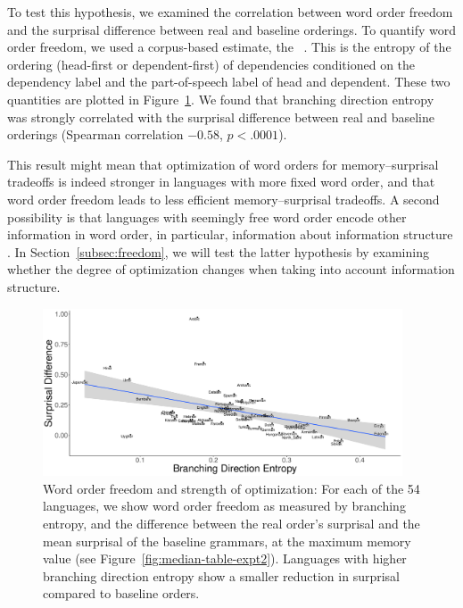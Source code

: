 To test this hypothesis, we examined the correlation between word order freedom and the surprisal difference between real and baseline orderings.
To quantify word order freedom, we used a corpus-based estimate, the ~\citep{futrell-quantifying-2015}.
This is the entropy of the ordering (head-first or dependent-first) of dependencies conditioned on the dependency label and the part-of-speech label of head and dependent.
These two quantities are plotted in Figure~\ref{fig:freedom-surp}.
We found that branching direction entropy was strongly correlated with the surprisal difference between real and baseline orderings (Spearman correlation $-0.58$, $p < .0001$).

This result might mean that optimization of word orders for memory--surprisal tradeoffs is indeed stronger in languages with more fixed word order, and that word order freedom leads to less efficient memory--surprisal tradeoffs.
A second possibility is that languages with seemingly free word order encode other information in word order, in particular, information about information structure \citep[e.g.][]{givon1988pragmatics,firbas1966defining,firbas1974aspects,myhill1985pragmatic}.
In Section~\ref{subsec:freedom}, we will test the latter hypothesis by examining whether the degree of optimization changes when taking into account information structure.




\begin{figure}
\includegraphics[width=0.95\textwidth]{figures/surprisal-branching-entropy-REAL-invert.pdf}
	\caption{Word order freedom and strength of optimization: For each of the 54 languages, we show word order freedom as measured by branching entropy, and the difference between the real order's surprisal and the mean surprisal of the baseline grammars, at the maximum memory value (see Figure~\ref{fig:median-table-expt2}).
	Languages with higher branching direction entropy show a smaller reduction in surprisal compared to baseline orders.
	}\label{fig:freedom-surp}
\end{figure}


